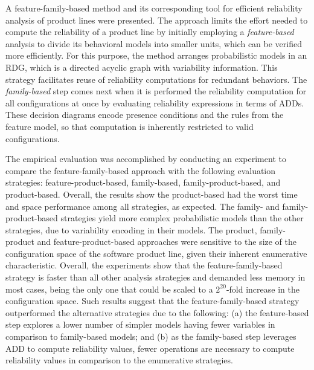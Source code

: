 

A feature-family-based method and its corresponding tool for
efficient reliability analysis of product lines were presented. The approach limits the effort
needed to compute the reliability of a product line by initially employing a
\emph{feature-based} analysis to divide its behavioral models into smaller
units, which can be verified more efficiently. For this purpose, the method arranges
probabilistic models in an RDG, which is a directed acyclic graph with
variability information. This strategy facilitates reuse of reliability
computations for redundant behaviors. The \emph{family-based} step comes next
when it is performed the reliability computation for all configurations at once by
evaluating reliability expressions in terms of ADDs.  These decision diagrams
encode presence conditions and the rules from the feature model, so that
computation is inherently restricted to valid configurations.


The empirical evaluation was accomplished by conducting an experiment to compare
the feature-family-based approach with the following evaluation strategies:
feature-product-based, family-based, family-product-based, and product-based.
Overall, the results show the product-based had the worst time and space
performance among all strategies, as expected. The family- and
family-product-based strategies yield more complex probabilistic models than the
other strategies, due to variability encoding in their models. The product,
family-product and feature-product-based approaches were sensitive to the size
of the configuration space of the software product line, given their inherent
enumerative characteristic. Overall, the experiments show that the
feature-family-based strategy is faster than all other analysis strategies and
demanded less memory in most cases, being the only one that could be scaled to a
$2^{20}$-fold increase in the configuration space. Such results suggest that the
feature-family-based strategy outperformed the alternative strategies due to the
following: (a) the feature-based step explores a lower number of simpler models
having fewer variables in comparison to family-based models; and (b) as the
family-based step leverages ADD to compute reliability values, fewer operations
are necessary to compute reliability values in comparison to the enumerative
strategies.







